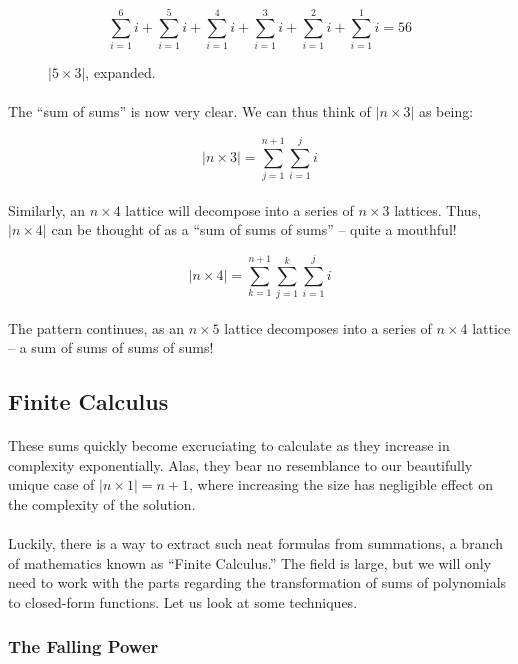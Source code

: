 \documentclass[12pt]{article}
\newcommand{\p}{\paragraph{}}
\begin{document}
			\begin{figure}[h]
				\begin{equation*}
				\sum_{i=1}^{6}i + \sum_{i=1}^{5}i + \sum_{i=1}^{4}i + \sum_{i=1}^{3}i + \sum_{i=1}^{2}i + \sum_{i=1}^{1}i = 56
				\end{equation*}
				
				\caption{$|5\times3|$, expanded.}
			\end{figure}
			
			
			\p The ``sum of sums'' is now very clear. We can thus think of $|n\times3|$ as being:
			
			\begin{equation*}
				|n\times3| = \sum_{j=1}^{n+1}\sum_{i=1}^{j}i
			\end{equation*}
			
			\p Similarly, an $n\times4$ lattice will decompose into a series of $n\times3$ lattices. Thus, $|n\times4|$ can be thought of as a ``sum of sums of sums'' -- quite a mouthful! 
			
			\begin{equation*}
				|n\times4| = \sum_{k=1}^{n+1}\sum_{j=1}^{k}\sum_{i=1}^{j}i
			\end{equation*} 
			
			\p The pattern continues, as an $n\times5$ lattice decomposes into a series of $n\times4$ lattice -- a sum of sums of sums of sums!
			
		\subsection{Finite Calculus}
		
			\p These sums quickly become excruciating to calculate as they increase in complexity exponentially. Alas, they bear no resemblance to our beautifully unique case of $|n\times1| = n+1$, where increasing the size has negligible effect on the complexity of the solution.
			
			\p Luckily, there is a way to extract such neat formulas from summations, a branch of mathematics known as ``Finite Calculus.'' The field is large, but we will only need to work with the parts regarding the transformation of sums of polynomials to closed-form functions. Let us look at some techniques.
			
			\subsubsection{The Falling Power}
			
\end{document}
